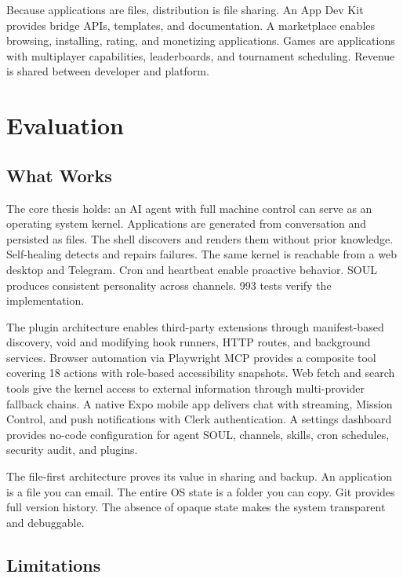\documentclass[11pt,a4paper]{article}
\begin{document}
Because applications are files, distribution is file sharing. An App Dev Kit provides bridge APIs, templates, and documentation. A marketplace enables browsing, installing, rating, and monetizing applications. Games are applications with multiplayer capabilities, leaderboards, and tournament scheduling. Revenue is shared between developer and platform.

\section{Evaluation}

\subsection{What Works}

The core thesis holds: an AI agent with full machine control can serve as an operating system kernel. Applications are generated from conversation and persisted as files. The shell discovers and renders them without prior knowledge. Self-healing detects and repairs failures. The same kernel is reachable from a web desktop and Telegram. Cron and heartbeat enable proactive behavior. SOUL produces consistent personality across channels. 993 tests verify the implementation.

The plugin architecture enables third-party extensions through manifest-based discovery, void and modifying hook runners, HTTP routes, and background services. Browser automation via Playwright MCP provides a composite tool covering 18 actions with role-based accessibility snapshots. Web fetch and search tools give the kernel access to external information through multi-provider fallback chains. A native Expo mobile app delivers chat with streaming, Mission Control, and push notifications with Clerk authentication. A settings dashboard provides no-code configuration for agent SOUL, channels, skills, cron schedules, security audit, and plugins.

The file-first architecture proves its value in sharing and backup. An application is a file you can email. The entire OS state is a folder you can copy. Git provides full version history. The absence of opaque state makes the system transparent and debuggable.

\subsection{Limitations}
\end{document}

